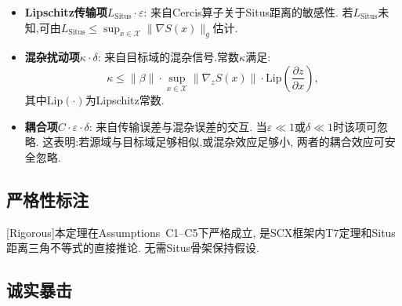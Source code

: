 \documentclass[12pt,a4paper]{article}
\newcommand{\rigorous}{\textcolor{green!50!black}{\small\textsf{[Rigorous]}}}
\newcommand{\cX}{\mathcal{X}}
\newcommand{\Situs}{\mathrm{Situs}}
\begin{document}
\begin{itemize}
    \item \textbf{Lipschitz传输项}$L_{\Situs} \cdot \varepsilon$:
    来自Cercis算子关于Situs距离的敏感性.
    若$L_{\Situs}$未知,可由$L_{\Situs} \leq \sup_{x \in \cX} \|\nabla S(x)\|_g$估计.

    \item \textbf{混杂扰动项}$\kappa \cdot \delta$:
    来自目标域的混杂信号.常数$\kappa$满足:
    \begin{equation}
        \kappa \leq \|\beta\| \cdot \sup_{x \in \cX} \|\nabla_z S(x)\|
        \cdot \mathrm{Lip}\!\left(\frac{\partial z}{\partial x}\right),
    \end{equation}
    其中$\mathrm{Lip}(\cdot)$为Lipschitz常数.

    \item \textbf{耦合项}$C \cdot \varepsilon \cdot \delta$:
    来自传输误差与混杂误差的交互.
    当$\varepsilon \ll 1$或$\delta \ll 1$时该项可忽略.
    这表明:若源域与目标域足够相似,或混杂效应足够小,
    两者的耦合效应可安全忽略.
\end{itemize}

\subsection{严格性标注}
\rigorous\quad 本定理在Assumptions~C1--C5下严格成立,
是SCX框架内T7定理和Situs距离三角不等式的直接推论.
无需Situs骨架保持假设.

\subsection{诚实暴击}
\end{document}
